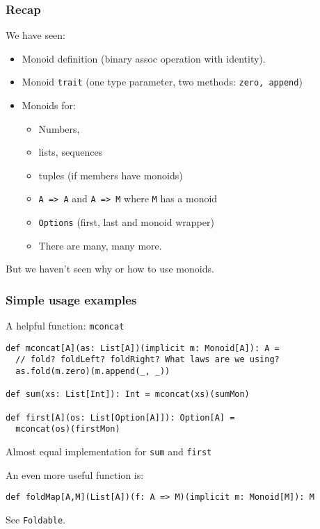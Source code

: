 \documentclass{beamer}
\begin{document}
\begin{frame}
  \frametitle{Recap}
  We have seen:
  \begin{itemize}
    \item Monoid definition (binary assoc operation with identity).
    \item Monoid \texttt{trait} (one type parameter,
      two methods: \texttt{zero, append})
    \item Monoids for:
      \begin{itemize}
      \item Numbers,
      \item lists, sequences
      \item tuples (if members have monoids)
      \item \texttt{A => A} and \texttt{A => M} where \texttt{M} has a monoid
      \item \texttt{Options} (first, last and monoid wrapper)
      \item There are many, many more.
      \end{itemize}
  \end{itemize}

  \begin{block}{}
    \centering
    But we haven't seen \alert{why} or \alert{how} to use monoids.
  \end{block}
\end{frame}

\begin{frame}[fragile]
  \frametitle{Simple usage examples}

  \begin{block}{A helpful function: \texttt{mconcat}}
  \begin{lstlisting}
def mconcat[A](as: List[A])(implicit m: Monoid[A]): A =
  // fold? foldLeft? foldRight? What laws are we using?
  as.fold(m.zero)(m.append(_, _))

def sum(xs: List[Int]): Int = mconcat(xs)(sumMon)

def first[A](os: List[Option[A]]): Option[A] =
  mconcat(os)(firstMon)
  \end{lstlisting}
  \end{block}

  Almost equal implementation for \texttt{sum} and \texttt{first}

  An even more useful function is:

  \begin{block}{}
  \begin{lstlisting}
def foldMap[A,M](List[A])(f: A => M)(implicit m: Monoid[M]): M
  \end{lstlisting}
  \end{block}
  See \texttt{Foldable}.
\end{frame}
\end{document}
